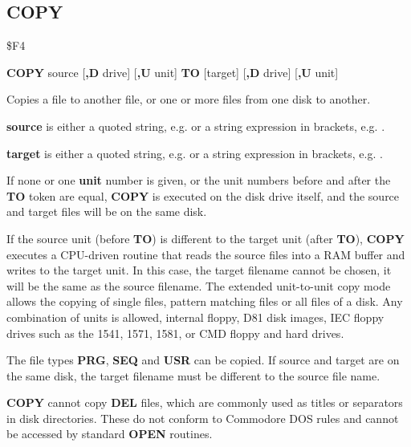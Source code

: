 \subsection{COPY}
\begin{description}[leftmargin=2cm,style=nextline]
\item [Token:]    \$F4

\item [Format:]   {\bf COPY} source [{\bf,D} drive] [{\bf,U} unit] {\bf TO} [target] [{\bf ,D} drive] [{\bf ,U} unit]

\item [Usage:]    Copies a file to another file, or one or more files from one disk to another.

                  {\bf source} is either a quoted string, e.g.  or a string expression in brackets, e.g. .

                  {\bf target} is either a quoted string, e.g.  or a string expression in brackets, e.g. .

                  \drivedefinition

                  \unitdefinition

                  If none or one {\bf unit} number is given, or the unit numbers before and after the {\bf TO} token are equal, {\bf COPY} is executed on the disk drive itself, and the source and target files will be on the same disk.

                  If the source unit (before {\bf TO}) is different to the target unit (after {\bf TO}), {\bf COPY} executes a CPU-driven routine that reads the source files into a RAM buffer and writes to the target unit. In this case, the target filename cannot be chosen, it will be the same as the source filename. The extended unit-to-unit copy mode allows the copying of single files, pattern matching files or all files of a disk. Any combination of units is allowed, internal floppy, D81 disk images, IEC floppy drives such as the 1541, 1571, 1581, or CMD floppy and hard drives.

\item [Remarks:]  The file types {\bf PRG}, {\bf SEQ} and {\bf USR} can be copied. If source and target are on the same disk, the target filename must be different to the source file name.

                  {\bf COPY} cannot copy {\bf DEL} files, which are commonly used as titles or separators in disk directories. These do not conform to Commodore DOS rules and cannot be accessed by standard {\bf OPEN} routines.


\end{description}

